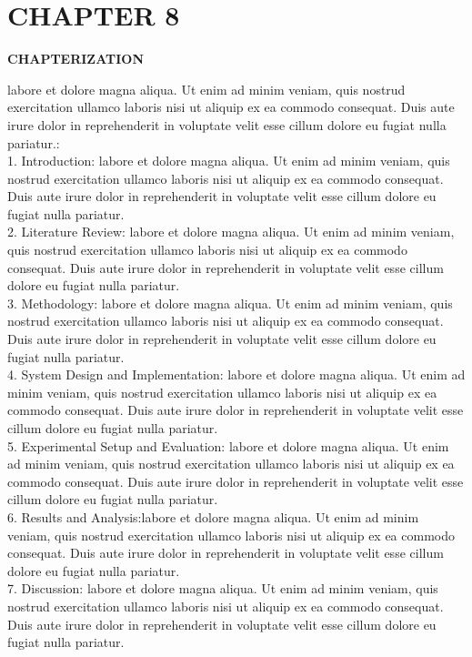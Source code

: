 \documentclass[12pt]{article}
\newcommand{\centersection}[1]{%
  \begin{center}
    \fontfamily{ptm}\fontsize{14}{16}\selectfont\bfseries\uppercase{#1}
  \end{center}
}
\begin{document}
\section*{CHAPTER 8}
\centersection{CHAPTERIZATION}
\fontsize{12}{14}\selectfont
labore et dolore magna aliqua. Ut enim ad minim veniam, quis nostrud exercitation ullamco laboris nisi ut aliquip ex ea commodo consequat. Duis aute irure dolor in reprehenderit in voluptate velit esse cillum dolore eu fugiat nulla pariatur.:\\
1.	Introduction: labore et dolore magna aliqua. Ut enim ad minim veniam, quis nostrud exercitation ullamco laboris nisi ut aliquip ex ea commodo consequat. Duis aute irure dolor in reprehenderit in voluptate velit esse cillum dolore eu fugiat nulla pariatur.\\
2.	Literature Review: labore et dolore magna aliqua. Ut enim ad minim veniam, quis nostrud exercitation ullamco laboris nisi ut aliquip ex ea commodo consequat. Duis aute irure dolor in reprehenderit in voluptate velit esse cillum dolore eu fugiat nulla pariatur.\\
3.	Methodology: labore et dolore magna aliqua. Ut enim ad minim veniam, quis nostrud exercitation ullamco laboris nisi ut aliquip ex ea commodo consequat. Duis aute irure dolor in reprehenderit in voluptate velit esse cillum dolore eu fugiat nulla pariatur.\\
4.	System Design and Implementation: labore et dolore magna aliqua. Ut enim ad minim veniam, quis nostrud exercitation ullamco laboris nisi ut aliquip ex ea commodo consequat. Duis aute irure dolor in reprehenderit in voluptate velit esse cillum dolore eu fugiat nulla pariatur.\\
5.	Experimental Setup and Evaluation: labore et dolore magna aliqua. Ut enim ad minim veniam, quis nostrud exercitation ullamco laboris nisi ut aliquip ex ea commodo consequat. Duis aute irure dolor in reprehenderit in voluptate velit esse cillum dolore eu fugiat nulla pariatur.\\
6.	Results and Analysis:labore et dolore magna aliqua. Ut enim ad minim veniam, quis nostrud exercitation ullamco laboris nisi ut aliquip ex ea commodo consequat. Duis aute irure dolor in reprehenderit in voluptate velit esse cillum dolore eu fugiat nulla pariatur.\\
7.	Discussion: labore et dolore magna aliqua. Ut enim ad minim veniam, quis nostrud exercitation ullamco laboris nisi ut aliquip ex ea commodo consequat. Duis aute irure dolor in reprehenderit in voluptate velit esse cillum dolore eu fugiat nulla pariatur.\\
\end{document}
